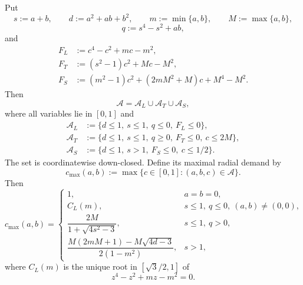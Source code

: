 \begin{proposition}
\label{prop:new-exact-local-set}
\label{prop:exact-admissible-set}
Put
\[
 s:=a+b,\qquad d:=a^2+ab+b^2,\qquad
 m:=\min\{a,b\},\qquad M:=\max\{a,b\},
\]
\[
 q:=s^4-s^2+ab,
\]
and
\begin{align*}
 F_L&:=c^4-c^2+mc-m^2,\\
 F_T&:=(s^2-1)c^2+Mc-M^2,\\
 F_S&:=(m^2-1)c^2+(2mM^2+M)c+M^4-M^2.
\end{align*}
Then
\begin{equation}
 \mathcal A=\mathcal A_L\cup\mathcal A_T\cup\mathcal A_S,
 \label{eq:derived-admissible-cells}
\end{equation}
where all variables lie in $[0,1]$ and
\begin{align*}
 \mathcal A_L&:=\{d\le1,\ s\le1,\ q\le0,\ F_L\le0\},\\
 \mathcal A_T&:=\{d\le1,\ s\le1,\ q\ge0,\ F_T\le0,\ c\le2M\},\\
 \mathcal A_S&:=\{d\le1,\ s>1,\ F_S\le0,\ c\le1/2\}.
\end{align*}
The set is coordinatewise down-closed.  Define its maximal radial demand by
\[
 c_{\max}(a,b):=\max\{c\in[0,1]:(a,b,c)\in\mathcal A\}.
\]
Then
\begin{equation}
 c_{\max}(a,b)=
 \begin{cases}
 1,&a=b=0,\\
 C_L(m),&s\le1,\ q\le0,\ (a,b)\ne(0,0),\\
 \dfrac{2M}{1+\sqrt{4s^2-3}},&s\le1,\ q>0,\\[3mm]
 \dfrac{M(2mM+1)-M\sqrt{4d-3}}{2(1-m^2)},&s>1,
 \end{cases}
 \label{eq:radial-envelope}
\end{equation}
where $C_L(m)$ is the unique root in $[\sqrt3/2,1]$ of
\[
 z^4-z^2+mz-m^2=0.
\]
\end{proposition}

